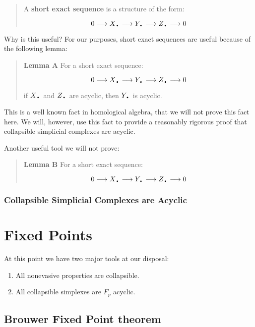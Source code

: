\documentclass[letterpaper,12pt]{article}
\newcommand{\lra}{\longrightarrow}
\newcommand{\tb}{\text{\textbullet}}
\begin{document}
\begin{quote}
    A \textbf{short exact sequence} is a structure of the form:

    $$0 \lra X_{\tb} \lra Y_{\tb} \lra Z_{\tb} \lra 0 $$

\end{quote}

Why is this useful? For our purposes, short exact sequences are useful because of the following lemma:

\begin{quote}
    \textbf{Lemma A} For a short exact sequence:

    $$0 \lra X_{\tb} \lra Y_{\tb} \lra Z_{\tb} \lra 0 $$

    if $X_{\tb}$ and $Z_{\tb}$ are acyclic, then $Y_{\tb}$ is acyclic.
\end{quote}

This is a well known fact in homological algebra, that we will not prove this fact here. We will, however, use this fact to provide a reasonably rigorous proof that collapsible simplicial complexes are acyclic.


Another useful tool we will not prove:

\begin{quote}
    \textbf{Lemma B} For a short exact sequence:

    $$0 \lra X_{\tb} \lra Y_{\tb} \lra Z_{\tb} \lra 0 $$ 

\end{quote}

\subsubsection{Collapsible Simplicial Complexes are Acyclic}

\section{Fixed Points}

At this point we have two major tools at our disposal:

\begin{enumerate}
    \item{
            All nonevasive properties are collapsible.
        }
    \item{
            All collapsible simplexes are $F_p$ acyclic.
        }
\end{enumerate}


\subsection{Brouwer Fixed Point theorem}
\end{document}

